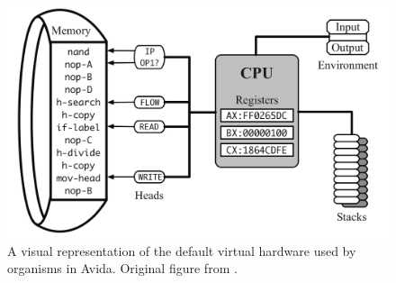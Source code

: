 
\begin{figure}[!t]
  \centering
  \includegraphics[width=\textwidth]{chapters/02-evolutionary-origins-of-plasticity/media/avida-virtual-cpu.png}
  \caption{\small 
    A visual representation of the default virtual hardware used by organisms in Avida. 
    Original figure from \citep{ofria_avida:_2009}.
  }
  \label{chapter:origins-of-plasticity:fig:avida-virtual-cpu}
\end{figure}